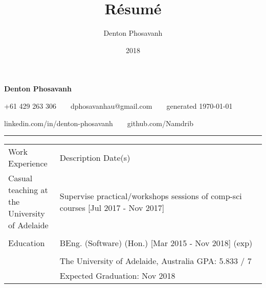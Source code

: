 \documentclass[a4paper]{article}
\title{R\'{e}sum\'{e}}
\author{Denton Phosavanh}
\date{2018}
\begin{document}
	\centering %
	{\LARGE \textbf{Denton Phosavanh}}

	+61 429 263 306\ \ \textbullet\ \ dphosavanhau@gmail.com\ \ \textbullet\ \ generated \today

	linkedin.com/in/denton-phosavanh\ \ \textbullet\ \ github.com/Namdrib
	\hrule
	\vspace{10px}


	\centering
	\begin{tabu} to 
		\rowfont{\bfseries\large} Work Experience & Description \hfill Date(s) \\
		Casual teaching at the University of Adelaide & Supervise practical/workshops sessions of comp-sci courses \hfill [Jul 2017 - Nov 2017] \\

		& \\
		\rowfont{\bfseries\large} Education & BEng. (Software) (Hon.) \hfill [Mar 2015 - Nov 2018] (exp) \\
		
		& \\
		& The University of Adelaide, Australia \hfill GPA: 5.833 / 7 \\
		& Expected Graduation: Nov 2018 \\


\end{tabu}
\end{document}
